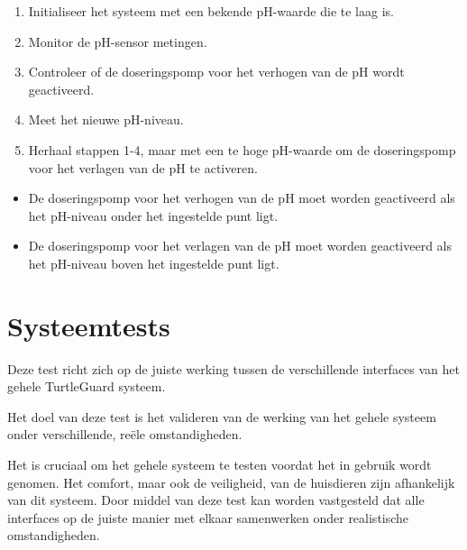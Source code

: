 \documentclass[a4paper]{report}
\newcommand{\turtleguard}{\mbox{TurtleGuard\texttrademark}\xspace}
\begin{document}
\begin{tcolorbox}[colback=white, colframe=black, title=Test Stappen]
  \begin{enumerate}
    \item Initialiseer het systeem met een bekende pH-waarde die te laag is.
    \item Monitor de pH-sensor metingen.
    \item Controleer of de doseringspomp voor het verhogen van de pH wordt geactiveerd.
    \item Meet het nieuwe pH-niveau.
    \item Herhaal stappen 1-4, maar met een te hoge pH-waarde om de doseringspomp voor het verlagen van de pH te activeren.
  \end{enumerate}
\end{tcolorbox}

\begin{tcolorbox}[colback=white, colframe=black, title=Slagingscriteria]
  \begin{itemize}
    \item De doseringspomp voor het verhogen van de pH moet worden geactiveerd als het pH-niveau onder het ingestelde punt ligt.
    \item De doseringspomp voor het verlagen van de pH moet worden geactiveerd als het pH-niveau boven het ingestelde punt ligt.
  \end{itemize}
\end{tcolorbox}


\section{Systeemtests}
\begin{tcolorbox}[colback=white, colframe=black, title=Beschrijving van de systeemtest]
  Deze test richt zich op de juiste werking tussen de verschillende interfaces van het gehele \turtleguard systeem.
\end{tcolorbox}

\begin{tcolorbox}[colback=white, colframe=black, title=Test Doel]
  Het doel van deze test is het valideren van de werking van het gehele systeem onder verschillende, reële omstandigheden.
\end{tcolorbox}

\begin{tcolorbox}[colback=white, colframe=black, title=Test Motivatie]
  Het is cruciaal om het gehele systeem te testen voordat het in gebruik wordt genomen. Het comfort, maar ook de veiligheid, van de huisdieren zijn afhankelijk van dit systeem.
  Door middel van deze test kan worden vastgesteld dat alle interfaces op de juiste manier met elkaar samenwerken onder realistische omstandigheden. 
\end{tcolorbox}
\end{document}
